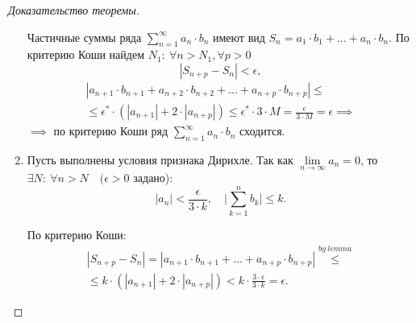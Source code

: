 \documentclass{report}
\theoremstyle{definition}
\begin{document}
\begin{proof}[Доказательство теоремы]
\begin{enumerate}
          Частичные суммы ряда $\sum_{n=1}^{\infty}a_n\cdot b_n$ имеют вид $S_n = a_1\cdot b_1 + \ldots + a_n \cdot b_n$. По критерию Коши найдем $N_1: \ \forall n > N_1, \forall p > 0$
          \begin{equation*}
            |S_{n+p} - S_n| < \epsilon,
          \end{equation*}
          \begin{multline*}
            |a_{n+1} \cdot b_{n+1} + a_{n+2} \cdot b_{n+2} + \ldots + a_{n+p} \cdot b_{n+p}| \leqslant \\
            \leqslant \epsilon^* \cdot (|a_{n+1}| + 2 \cdot |a_{n+p}|) \leqslant \epsilon^* \cdot 3 \cdot M = \frac{\epsilon}{3 \cdot M} = \epsilon \implies
          \end{multline*}
          $\implies$ по критерию Коши ряд $\sum_{n=1}^{\infty}a_n \cdot b_n$ сходится.

    \item Пусть выполнены условия признака Дирихле. Так как $\underset{n\rightarrow\infty}{\lim}a_n = 0$, то $\exists N: \ \forall n > N \quad (\epsilon > 0$ задано):
          \begin{equation*}
            |a_n| < \frac{\epsilon}{3 \cdot k}, \quad \bigg|\sum_{k=1}^{n}b_k\bigg| \leqslant k.
          \end{equation*}

          По критерию Коши:
          \begin{multline*}
            |S_{n+p} - S_n| = |a_{n+1} \cdot b_{n+1} + \ldots + a_{n+p} \cdot b_{n+p}| \overset{by \ lemma}{\leqslant} \\
            \leqslant k\cdot(|a_{n+1}| + 2\cdot |a_{n+p}|) < k\cdot \frac{3\cdot \epsilon}{3 \cdot k} = \epsilon.
          \end{multline*}
  \end{enumerate}
\end{proof}
\end{document}

